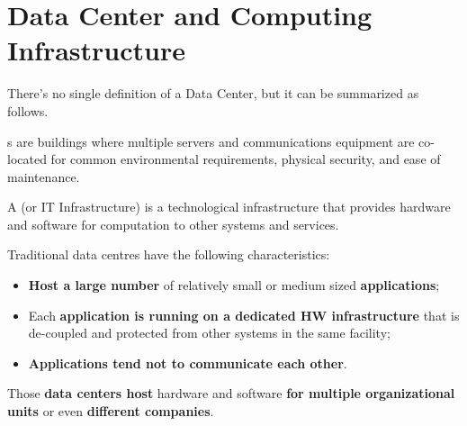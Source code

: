 \section{Data Center and Computing Infrastructure}

There's no single definition of a Data Center, but it can be summarized as follows.

\begin{definitionbox}\label{Data Center definition}
    s are buildings where multiple servers and communications equipment are co-located for common environmental requirements, physical security, and ease of maintenance.\cite{barroso2022datacenter}
\end{definitionbox}

\begin{definitionbox}
    A  (or IT Infrastructure) is a technological infrastructure that provides hardware and software for computation to other systems and services.
\end{definitionbox}

\noindent
Traditional data centres have the following characteristics:
\begin{itemize}
    \item \textbf{Host a large number} of relatively small or medium sized \textbf{applications};
    
    \item Each \textbf{application is running on a dedicated HW infrastructure} that is de-coupled and protected from other systems in the same facility;
    
    \item \textbf{Applications tend not to communicate each other}.
\end{itemize}
Those \textbf{data centers host} hardware and software \textbf{for multiple organizational units} or even \textbf{different companies}.